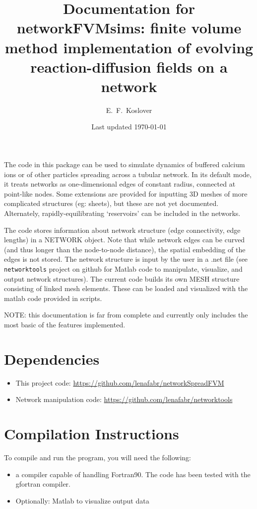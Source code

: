 \documentclass[12pt]{article}
\begin{document}
\title{\vspace{-2cm}Documentation for networkFVMsims: finite volume method implementation of evolving reaction-diffusion fields on a network}
\author{E.~F.~Koslover}
\date{Last updated \today}
\maketitle

The code in this package can be used to simulate dynamics of buffered calcium ions or of other particles spreading across a tubular network. In its default mode, it treats networks as one-dimensional edges of constant radius, connected at point-like nodes. Some extensions are provided for inputting 3D meshes of more complicated structures (eg: sheets), but these are not yet documented. Alternately, rapidly-equilibrating `reservoirs' can be included in the networks.

The code stores information about network structure (edge connectivity, edge lengths) in a NETWORK object. Note that while network edges can be curved (and thus longer than the node-to-node distance), the spatial embedding of the edges is not stored. The network structure is input by the user in a .net file (see \verb=networktools= project on github for Matlab code to manipulate, visualize, and output network structures). The current code builds its own MESH structure consisting of linked mesh elements. These can be loaded and visualized with the matlab code provided in scripts.

NOTE: this documentation is far from complete and currently only includes the most basic of the features implemented.
\section{Dependencies}
\begin{itemize}
	\item This project code: \url{https://github.com/lenafabr/networkSpreadFVM}
	\item Network manipulation code: \url{https://github.com/lenafabr/networktools} 
\end{itemize}

\section{Compilation Instructions}
To compile and run the program, you will need the following:
\begin{itemize}
\item a compiler capable of handling Fortran90.
The code has been tested with the gfortran compiler.
\item Optionally: Matlab to visualize output data
\end{itemize}
\end{document}
